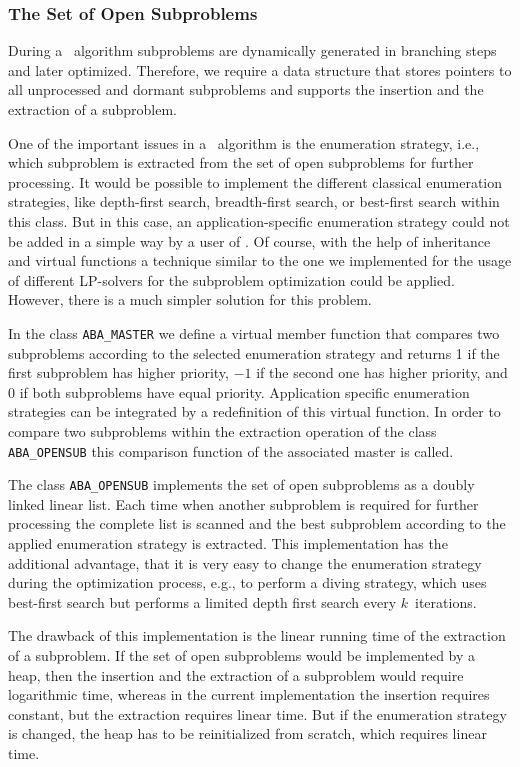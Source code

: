 \subsubsection{The Set of Open Subproblems}
\noindent
During a \bab\ algorithm subproblems
are dynamically generated in branching steps
and later optimized. Therefore, we require a data
structure that stores pointers to all unprocessed and dormant subproblems
and supports the insertion and the extraction of a subproblem.

One of the important issues in a \bab\ algorithm is the enumeration strategy, i.e., 
which subproblem is extracted from the set of open subproblems for further 
processing. It would be possible to implement the different
classical enumeration strategies, like depth-first search, 
breadth-first search, or best-first search within this class.
But in this case, an application-specific enumeration strategy could not be
added in a simple way by a user of \ABACUS. Of course, with the help
of inheritance and virtual functions a technique similar to
the one we implemented for the usage of different LP-solvers
for the subproblem optimization could be applied. However, there
is a much simpler solution for this problem.

In the class {\tt ABA\_MASTER} we define a virtual member function
that compares two subproblems according to the
selected enumeration strategy and returns 1 if the first 
subproblem has higher priority, $-1$ if the second one has
higher priority, and 0 if both subproblems have equal priority.
Application specific enumeration strategies can be integrated
by a redefinition of this virtual function.
In order to compare two subproblems within the extraction operation
of the class {\tt ABA\_OPENSUB} this
comparison function of the associated master is called.

The class {\tt ABA\_OPENSUB} implements the set of open subproblems
as a doubly linked linear list. Each time when another subproblem is 
required for further processing the complete list is scanned
and the best subproblem according to the applied enumeration
strategy is extracted. This implementation has the additional
advantage, that it is very easy to change the enumeration strategy
during the optimization process, e.g., to perform a diving strategy, which
uses best-first search but performs a limited depth first search
every $k$~iterations.

The drawback of this implementation is the linear running time of 
the extraction of a subproblem. If the set of open subproblems
would be implemented by a heap, then the insertion and the
extraction of a subproblem would require logarithmic time, 
whereas in the current implementation the insertion requires
constant, but the extraction requires linear time. But if
the enumeration strategy is changed, the heap has to be reinitialized
from scratch, which requires linear time.


